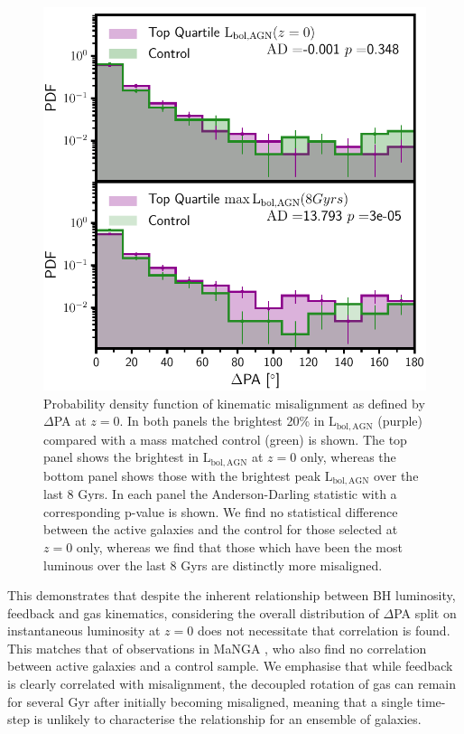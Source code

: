 \documentclass[fleqn,usenatbib]{mnras}
\begin{document}
\begin{figure}
    \centering
	\includegraphics[width=\linewidth]{overall_population/PA_distribution_low_mass_z0_max_comparison.pdf}
    \caption{Probability density function of kinematic misalignment as defined by $\Delta$PA at $z=0$. In both panels the brightest 20\% in $\mathrm{L_{bol,AGN}}$ (purple) compared with a mass matched control (green) is shown. The top panel shows the brightest in $\mathrm{L_{bol,AGN}}$ at $z=0$ only, whereas the bottom panel shows those with the brightest peak $\mathrm{L_{bol, AGN}}$ over the last 8 Gyrs. In each panel the Anderson-Darling statistic with a corresponding p-value is shown. We find no statistical difference between the active galaxies and the control for those selected at $z=0$ only, whereas we find that those which have been the most luminous over the last 8 Gyrs are distinctly more misaligned.}
    \label{fig:PAdist}
\end{figure}

This demonstrates that despite the inherent relationship between BH luminosity, feedback and gas kinematics, considering the overall distribution of $\Delta$PA split on instantaneous luminosity at $z=0$ does not necessitate that correlation is found. This matches that of observations in MaNGA \citep[Figure 6 in][]{ilha2019}, who also find no correlation between active galaxies and a control sample. We emphasise that while feedback is clearly correlated with misalignment, the decoupled rotation of gas can remain for several Gyr after initially becoming misaligned, meaning that a single time-step is unlikely to characterise the relationship for an ensemble of galaxies. 
\end{document}
